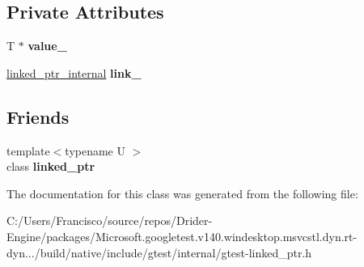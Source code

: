 \subsection*{Private Attributes}
\begin{DoxyCompactItemize}
\item 
\mbox{\label{classtesting_1_1internal_1_1linked__ptr_abb52c4e944fc7a24a4ec7788b612fb37}} 
T $\ast$ {\bfseries value\+\_\+}
\item 
\mbox{\label{classtesting_1_1internal_1_1linked__ptr_a8fdfa75fea8bfc10825a3cc53c50461f}} 
\hyperlink{classtesting_1_1internal_1_1linked__ptr__internal}{linked\+\_\+ptr\+\_\+internal} {\bfseries link\+\_\+}
\end{DoxyCompactItemize}
\subsection*{Friends}
\begin{DoxyCompactItemize}
\item 
\mbox{\label{classtesting_1_1internal_1_1linked__ptr_a7763f286ca03a7f7363a033d996c8c1c}} 
{\footnotesize template$<$typename U $>$ }\\class {\bfseries linked\+\_\+ptr}
\end{DoxyCompactItemize}


The documentation for this class was generated from the following file\+:\begin{DoxyCompactItemize}
\item 
C\+:/\+Users/\+Francisco/source/repos/\+Drider-\/\+Engine/packages/\+Microsoft.\+googletest.\+v140.\+windesktop.\+msvcstl.\+dyn.\+rt-\/dyn.../build/native/include/gtest/internal/gtest-\/linked\+\_\+ptr.\+h\end{DoxyCompactItemize}
